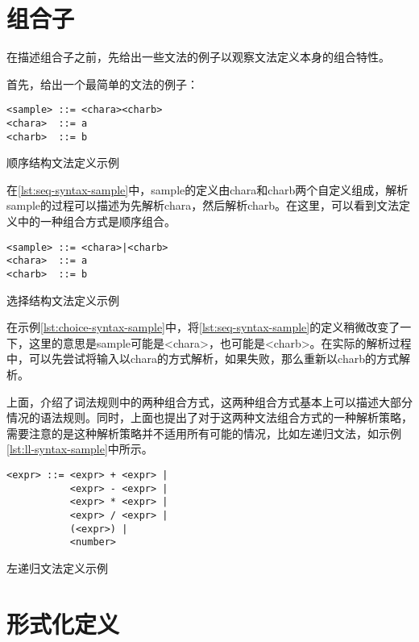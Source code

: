 \section{组合子}

在描述组合子之前，先给出一些文法的例子以观察文法定义本身的组合特性。

首先，给出一个最简单的文法的例子：

\begin{listing}
\begin{verbatim}
<sample> ::= <chara><charb>
<chara>  ::= a
<charb>  ::= b
\end{verbatim}
\caption{顺序结构文法定义示例}
\label{lst:seq-syntax-sample}
\end{listing}

在\ref{lst:seq-syntax-sample}中，sample的定义由chara和charb两个自定义组成，解析sample的过程可以描述为先解析chara，然后解析charb。在这里，可以看到文法定义中的一种组合方式是顺序组合。

\begin{listing}
\begin{verbatim}
<sample> ::= <chara>|<charb>
<chara>  ::= a
<charb>  ::= b
\end{verbatim}
\caption{选择结构文法定义示例}
\label{lst:choice-syntax-sample}
\end{listing}

在示例\ref{lst:choice-syntax-sample}中，将\ref{lst:seq-syntax-sample}的定义稍微改变了一下，这里的意思是sample可能是<chara>，也可能是<charb>。在实际的解析过程中，可以先尝试将输入以chara的方式解析，如果失败，那么重新以charb的方式解析。

上面，介绍了词法规则中的两种组合方式，这两种组合方式基本上可以描述大部分情况的语法规则。同时，上面也提出了对于这两种文法组合方式的一种解析策略，需要注意的是这种解析策略并不适用所有可能的情况，比如左递归文法，如示例\ref{lst:ll-syntax-sample}中所示。

\begin{listing}
\begin{verbatim}
<expr> ::= <expr> + <expr> |
           <expr> - <expr> |
           <expr> * <expr> |
           <expr> / <expr> |
           (<expr>) |
           <number>
\end{verbatim}
\caption{左递归文法定义示例}
\label{lst:ll-syntax-sample}
\end{listing}

\section{形式化定义}

